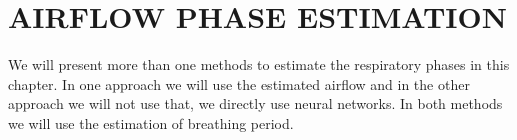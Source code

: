 \chapter{AIRFLOW PHASE ESTIMATION}
\label{chp:airflow_phase_estimation}
We will present more than one methods to estimate the respiratory phases in this chapter. In one approach we will use the estimated airflow and in the other approach we will not use that, we directly use neural networks. In both methods we will use the estimation of breathing period.




